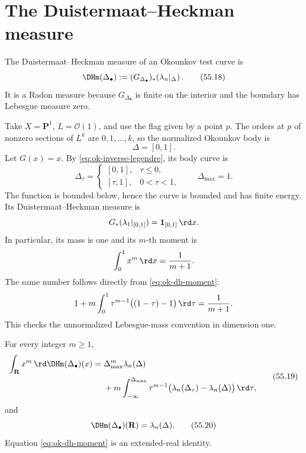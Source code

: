 \section{The Duistermaat--Heckman measure}
\label{sec:ok-dh}

\begin{definition}
\label{def:ok-dh-body}
The Duistermaat--Heckman measure of an Okounkov test curve is
\[
        \DHm(\Delta_\bullet)
           :=(G_{\Delta_\bullet})_*\!
             \left(\lambda_n|_\Delta\right).
\tag{55.18}\label{eq:ok-dh-body}
\]
It is a Radon measure because $G_{\Delta_\bullet}$ is finite on the
interior and the boundary has Lebesgue measure zero.
\end{definition}

\begin{example}
\label{ex:ok-dh-p1-interval}
Take $X=\mathbf P^1$, $L=\mathcal O(1)$, and use the flag given by a
point $p$.  The orders at $p$ of nonzero sections of $L^k$ are
$0,1,\ldots,k$, so the normalized Okounkov body is
\[
                         \Delta=[0,1].
\]
Let $G(x)=x$.  By \eqref{eq:ok-inverse-legendre}, its body curve is
\[
 \Delta_\tau=
 \begin{cases}
 [0,1],&\tau\leq0,\\
 [\tau,1],&0<\tau<1,
 \end{cases}
 \qquad \Delta_{\max}=1.
\]
The function is bounded below, hence the curve is bounded and has finite
energy.  Its Duistermaat--Heckman measure is
\[
                 G_*(\lambda_1|_{[0,1]})
                    =\mathbf 1_{[0,1]}\,\rd x.
\]
In particular, its mass is one and its $m$-th moment is
\[
                 \int_0^1x^m\,\rd x=\frac1{m+1}.
\]
The same number follows directly from \eqref{eq:ok-dh-moment}:
\[
 1+m\int_0^1\tau^{m-1}\bigl((1-\tau)-1\bigr)\,\rd\tau
       =\frac1{m+1}.
\]
This checks the unnormalized Lebesgue-mass convention in dimension one.
\end{example}

\begin{proposition}\label{prop:ok-dh-body-moments}
For every integer $m\geq1$,
\[
\begin{split}
 \int_{\mathbf R}x^m\,\rd \DHm(\Delta_\bullet)(x)
  ={}&\Delta_{\max}^m\lambda_n(\Delta)\\
     &+m\int_{-\infty}^{\Delta_{\max}}
       \tau^{m-1}
       \bigl(\lambda_n(\Delta_\tau)-\lambda_n(\Delta)\bigr)\,\rd \tau,
\end{split}
\tag{55.19}\label{eq:ok-dh-moment}
\]
and
\[
             \DHm(\Delta_\bullet)(\mathbf R)=\lambda_n(\Delta).
\tag{55.20}\label{eq:ok-dh-mass}
\]
Equation \eqref{eq:ok-dh-moment} is an extended-real identity.
\end{proposition}

